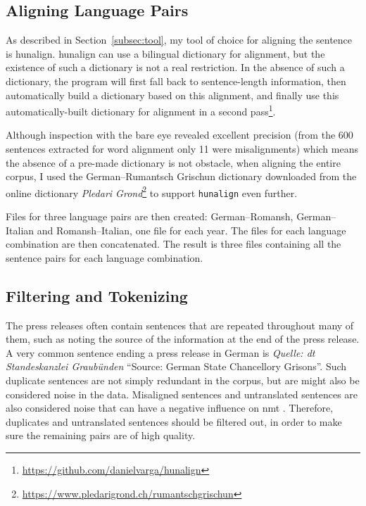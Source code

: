 \subsection{Aligning Language Pairs}
\label{sec:aligning-language-pairs}
As described in Section~\ref{subsec:tool}, my tool of choice for aligning the sentence is hunalign. 
hunalign can use a bilingual dictionary for alignment, but the existence of such a dictionary is not a real restriction. 
In the absence of such a dictionary, the program will first fall back to sentence-length information, then automatically build a dictionary based on this alignment, and finally use this automatically-built dictionary for alignment in a second pass\footnote{\url{https://github.com/danielvarga/hunalign}}.

Although inspection with the bare eye revealed excellent precision (from the 600 sentences extracted for word alignment only 11 were misalignments) which means the absence of a pre-made dictionary is not obstacle, when aligning the entire corpus, I used the German--Rumantsch Grischun dictionary downloaded from the online dictionary \emph{Pledari Grond}\footnote{\url{https://www.pledarigrond.ch/rumantschgrischun}} to support \texttt{hunalign} even further.

Files for three language pairs are  then created: German--Romansh, German--Italian and Romansh--Italian, one file for each year. 
The files for each language combination are then concatenated.
The result is three files containing all the sentence pairs for each language combination.

\subsection{Filtering and Tokenizing}
The press releases often contain sentences that are repeated throughout many of them, such as noting the source of the information at the end of the press release. 
A very common sentence ending a press release in German is \emph{Quelle: dt Standeskanzlei Graubünden} \enquote{Source: German State Chancellory Grisons}. 
Such duplicate sentences are not simply redundant in the corpus, but are might also be considered noise in the data. %
Misaligned sentences and untranslated sentences are also considered noise that can have a negative influence on \acrshort{nmt} \autocite{khayrallah-koehn-2018-impact}.
Therefore, duplicates and untranslated sentences should be filtered out, in order to make sure the remaining pairs are of high quality.

